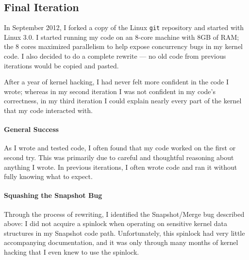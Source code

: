 \subsection{Final Iteration}
In September 2012, I forked a copy of the Linux {\tt git} repository and
started with Linux 3.0. I started running my code on an 8-core machine with
8GB of RAM; the 8 cores maximized parallelism to help expose concurrency
bugs in my kernel code. I also decided to do a complete rewrite --- no old code
from previous iterations would be copied and pasted.

After a year of kernel hacking, I had never felt more confident in the code I
wrote; whereas in my second iteration I was not confident in my code's
correctness, in my third iteration I could explain nearly every part of the
kernel that my code interacted with.

\paragraph{General Success}
As I wrote and tested code, I often found that my code worked on the first or
second try. This was primarily due to careful and thoughtful reasoning about
anything I wrote. In previous iterations, I often wrote code and ran it without
fully knowing what to expect.

\paragraph{Squashing the Snapshot Bug}
Through the process of rewriting, I identified the Snapshot/Merge bug described
above: I did not acquire a spinlock when operating on sensitive kernel data
structures in my Snapshot code path. Unfortunately, this spinlock had very
little accompanying documentation, and it was only through many months of
kernel hacking that I even knew to use the spinlock.

\endinput

